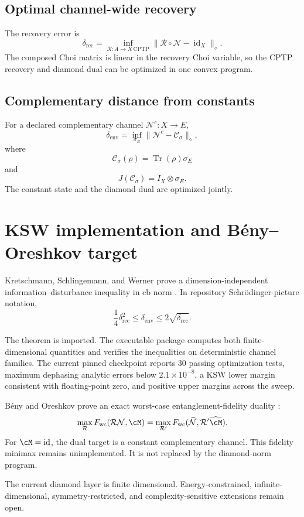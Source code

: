 \documentclass[11pt]{article}
\newcommand{\cN}{\mathcal N}
\newcommand{\cR}{\mathcal R}
\newcommand{\cC}{\mathcal C}
\newcommand{\id}{\operatorname{id}}
\newcommand{\Tr}{\operatorname{Tr}}
\begin{document}
\subsection{Optimal channel-wide recovery}

The recovery error is
\[
\delta_{\mathrm{rec}}
=
\inf_{\cR:A\to X\,\mathrm{CPTP}}
\|\cR\circ\cN-\id_X\|_\diamond.
\]
The composed Choi matrix is linear in the recovery Choi variable, so the CPTP recovery and diamond dual can be optimized in one convex program.

\subsection{Complementary distance from constants}

For a declared complementary channel $\cN^c:X\to E$,
\[
\delta_{\mathrm{env}}
=
\inf_{\sigma_E}
\|\cN^c-\cC_\sigma\|_\diamond,
\]
where
\[
\cC_\sigma(\rho)=\Tr(\rho)\sigma_E
\]
and
\[
J(\cC_\sigma)=I_X\otimes\sigma_E.
\]
The constant state and the diamond dual are optimized jointly.

\section{KSW implementation and B\'eny--Oreshkov target}
\label{sec:ksw}

Kretschmann, Schlingemann, and Werner prove a dimension-independent information--disturbance inequality in cb norm \citep{KretschmannEtAl2006}. In repository Schr\"odinger-picture notation,
\[
\frac14\delta_{\mathrm{rec}}^2
\leq
\delta_{\mathrm{env}}
\leq
2\sqrt{\delta_{\mathrm{rec}}}.
\]

The theorem is imported. The executable package computes both finite-dimensional quantities and verifies the inequalities on deterministic channel families. The current pinned checkpoint reports 30 passing optimization tests, maximum dephasing analytic errors below $2.1\times10^{-8}$, a KSW lower margin consistent with floating-point zero, and positive upper margins across the sweep.

B\'eny and Oreshkov prove an exact worst-case entanglement-fidelity duality \citep{BenyOreshkov2009}:
\[
\max_{\cR}F_{\mathrm{wc}}(\cR\cN,\cM)
=
\max_{\cR'}F_{\mathrm{wc}}(\widehat{\cN},\cR'\widehat{\cM}).
\]
For $\cM=\id$, the dual target is a constant complementary channel. This fidelity minimax remains unimplemented. It is not replaced by the diamond-norm program.

The current diamond layer is finite dimensional. Energy-constrained, infinite-dimensional, symmetry-restricted, and complexity-sensitive extensions remain open.
\end{document}
